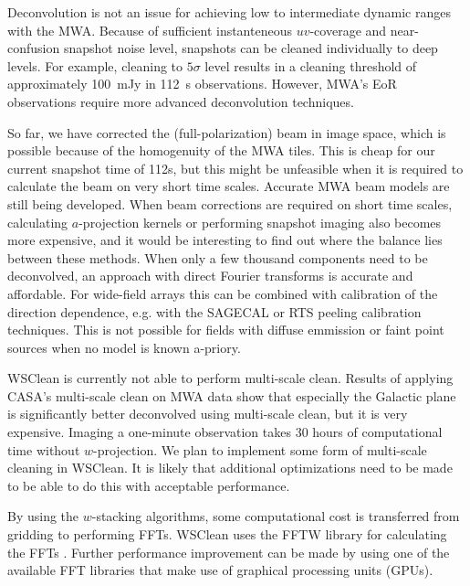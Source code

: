 \documentclass[useAMS,usenatbib]{mn2e}
\begin{document}
Deconvolution is not an issue for achieving low to intermediate dynamic ranges with the MWA. Because of sufficient instanteneous $uv$-coverage and near-confusion snapshot noise level, snapshots can be cleaned individually to deep levels. For example, cleaning to $5\sigma$ level results in a cleaning threshold of approximately 100~mJy in 112~s observations. However, MWA's EoR observations \citep{bowman-science-with-the-mwa-2013} require more advanced deconvolution techniques.

So far, we have corrected the (full-polarization) beam in image space, which is possible because of the homogenuity of the MWA tiles. This is cheap for our current snapshot time of 112s, but this might be unfeasible when it is required to calculate the beam on very short time scales. Accurate MWA beam models are still being developed. When beam corrections are required on short time scales, calculating $a$-projection kernels or performing snapshot imaging also becomes more expensive, and it would be interesting to find out where the balance lies between these methods. When only a few thousand components need to be deconvolved, an approach with direct Fourier transforms is accurate and affordable. For wide-field arrays this can be combined with calibration of the direction dependence, e.g. with the SAGECAL \citep{sage-calibration-ii} or RTS peeling \citep{rts-mwa} calibration techniques. This is not possible for fields with diffuse emmission or faint point sources when no model is known a-priory.

WSClean is currently not able to perform multi-scale clean. Results of applying CASA's multi-scale clean on MWA data show that especially the Galactic plane is significantly better deconvolved using multi-scale clean, but it is very expensive. Imaging a one-minute observation takes 30 hours of computational time without $w$-projection. We plan to implement some form of multi-scale cleaning in WSClean. It is likely that additional optimizations need to be made to be able to do this with acceptable performance.

By using the $w$-stacking algorithms, some computational cost is transferred from gridding to performing FFTs. WSClean uses the FFTW library for calculating the FFTs \citep{fftw-2005}. Further performance improvement can be made by using one of the available FFT libraries that make use of graphical processing units (GPUs).
\end{document}
